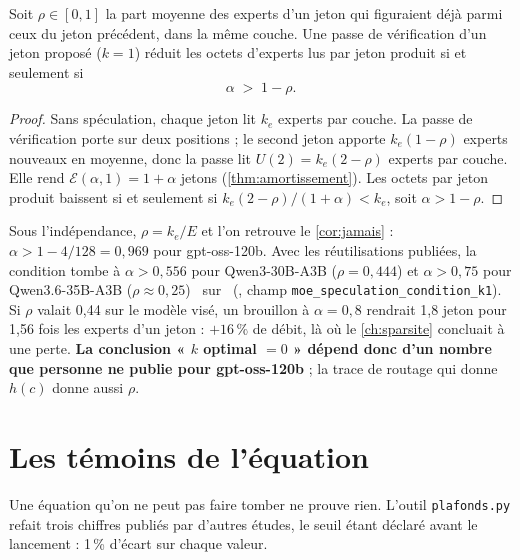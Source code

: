 \begin{proposition}\label{prop:spec-rho}
Soit $\rho \in [0, 1]$ la part moyenne des experts d'un jeton qui figuraient déjà parmi ceux du jeton précédent, dans la même couche. Une passe de vérification d'un jeton proposé ($k = 1$) réduit les octets d'experts lus par jeton produit si et seulement si
\begin{equation}\label{eq:spec-rho}
\alpha \;>\; 1 - \rho .
\end{equation}
\end{proposition}

\begin{proof}
Sans spéculation, chaque jeton lit $k_e$ experts par couche. La passe de vérification porte sur deux positions ; le second jeton apporte $k_e(1-\rho)$ experts nouveaux en moyenne, donc la passe lit $U(2) = k_e(2-\rho)$ experts par couche. Elle rend $\mathcal E(\alpha,1) = 1 + \alpha$ jetons (\cref{thm:amortissement}). Les octets par jeton produit baissent si et seulement si $k_e(2-\rho)/(1+\alpha) < k_e$, soit $\alpha > 1 - \rho$.
\end{proof}

Sous l'indépendance, $\rho = k_e/E$ et l'on retrouve le \cref{cor:jamais} : $\alpha > 1 - 4/128 = 0{,}969$ pour gpt-oss-120b. Avec les réutilisations publiées, la condition tombe à $\alpha > 0{,}556$ pour Qwen3-30B-A3B ($\rho = 0{,}444$) et $\alpha > 0{,}75$ pour Qwen3.6-35B-A3B ($\rho \approx 0{,}25$) \calc~sur \litt~(, champ \texttt{moe\_speculation\_condition\_k1}). Si $\rho$ valait 0,44 sur le modèle visé, un brouillon à $\alpha = 0{,}8$ rendrait 1,8 jeton pour 1,56 fois les experts d'un jeton : $+16\,\%$ de débit, là où le \cref{ch:sparsite} concluait à une perte. \textbf{La conclusion « $k$ optimal $= 0$ » dépend donc d'un nombre que personne ne publie pour gpt-oss-120b} ; la trace de routage qui donne $h(c)$ donne aussi $\rho$.

\section{Les témoins de l'équation}\label{sec:temoins-equation}

Une équation qu'on ne peut pas faire tomber ne prouve rien. L'outil \texttt{plafonds.py} refait trois chiffres publiés par d'autres études, le seuil étant déclaré avant le lancement : 1\,\% d'écart sur chaque valeur.

